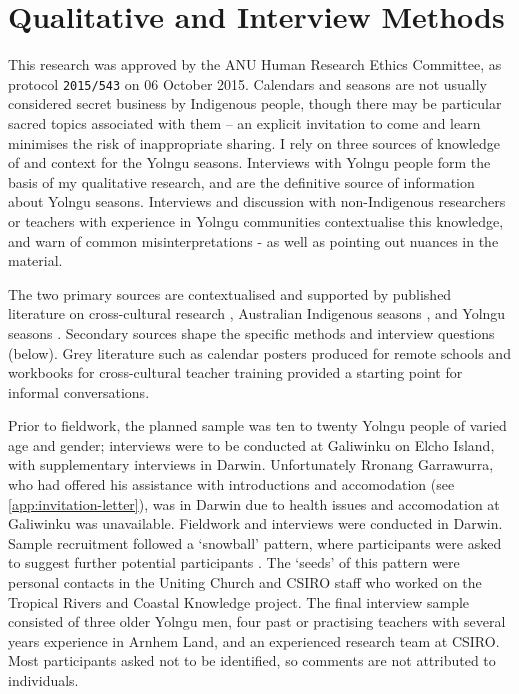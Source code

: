 \section{Qualitative and Interview Methods}

This research was approved by the ANU Human Research Ethics Committee,
as protocol \texttt{2015/543} on 06 October 2015.
Calendars and seasons are not usually considered secret business by Indigenous people, though
there may be particular sacred topics associated with them -- an explicit
invitation to come and learn minimises the risk of inappropriate sharing.
%
I rely on three sources of knowledge of and context for the Yolngu
seasons.  Interviews with Yolngu people form the basis of my qualitative
research, and are the definitive source of information about Yolngu seasons.
Interviews and discussion with non-Indigenous researchers or teachers with
experience in Yolngu communities contextualise this knowledge, and warn of
common misinterpretations - as well as pointing out nuances in the material.

The two primary sources are contextualised and supported by published
literature on cross-cultural research \citep[eg.][]{smith1999}, Australian
Indigenous seasons \citep[eg.][]{prober2011,oconnor2010}, and Yolngu seasons
\citep{davis1989,atlas2014}.  Secondary sources shape the specific methods
and interview questions (below).  Grey literature such as calendar posters
produced for remote schools and workbooks for cross-cultural teacher
training provided a starting point for informal conversations.


Prior to fieldwork, the planned sample was ten to twenty Yolngu people
of varied age and gender; interviews were to be conducted at Galiwinku
on Elcho Island, with supplementary interviews in Darwin.  Unfortunately
Rronang Garrawurra, who had offered his assistance with introductions
and accomodation (see \cref{app:invitation-letter}), was in Darwin due
to health issues and accomodation at Galiwinku was unavailable.
%
Fieldwork and interviews were conducted in Darwin.  Sample
recruitment followed a `snowball' pattern, where participants were asked
to suggest further potential participants \citep{patrick1996}.  The `seeds'
of this pattern were personal contacts in the Uniting Church and CSIRO
staff who worked on the Tropical Rivers and Coastal Knowledge project.
%
The final interview sample consisted of three older Yolngu men, four past
or practising teachers with several years experience in Arnhem Land, and
an experienced research team at CSIRO.  Most participants asked not to be identified, so comments
are not attributed to individuals.


